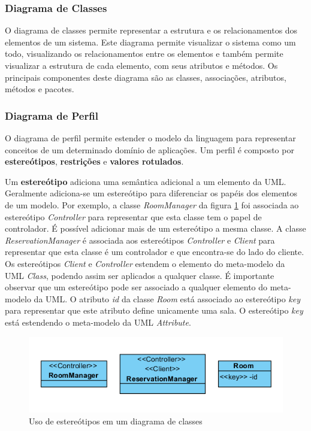 \subsubsection{Diagrama de Classes}

O diagrama de classes permite representar a estrutura e os relacionamentos dos elementos de um sistema. Este diagrama permite visualizar o sistema
como um todo, visualizando os relacionamentos entre os elementos e também permite visualizar a estrutura de cada elemento, com seus atributos e
métodos. Os principais componentes deste diagrama são as classes, associações, atributos, métodos e pacotes.

\subsubsection{Diagrama de Perfil}

O diagrama de perfil permite estender o modelo da linguagem para representar conceitos de um determinado domínio de aplicações. Um perfil é composto
por \textbf{estereótipos}, \textbf{restrições} e \textbf{valores rotulados}. 

Um \textbf{estereótipo} adiciona uma semântica adicional a um elemento da UML. Geralmente adiciona-se um estereótipo para diferenciar os papéis dos
elementos de um modelo. Por exemplo, a classe \textit{RoomManager} da figura \ref{fig:stereotype_1} foi associada ao estereótipo \textit{Controller} 
para representar que esta classe tem o papel de controlador. É possível adicionar mais de um estereótipo a mesma classe. A classe
\textit{ReservationManager} é associada aos estereótipos \textit{Controller} e \textit{Client} para representar que esta classe é
um controlador e que encontra-se do lado do cliente. Os estereótipos \textit{Client} e \textit{Controller} estendem o elemento do 
meta-modelo da UML \textit{Class}, podendo assim ser aplicados a qualquer classe.  É importante observar que um estereótipo pode ser associado a
qualquer elemento do meta-modelo da UML. O atributo \textit{id} da classe \textit{Room} está associado ao estereótipo \textit{key} para representar
que este atributo define unicamente uma sala. O estereótipo \textit{key} está estendendo o meta-modelo da UML \textit{Attribute}.

\begin{figure}
	\centering
	\includegraphics[scale=0.9]{img/stereotype_1.png}
	\caption{Uso de estereótipos em um diagrama de classes}\label{fig:stereotype_1}
\end{figure}

